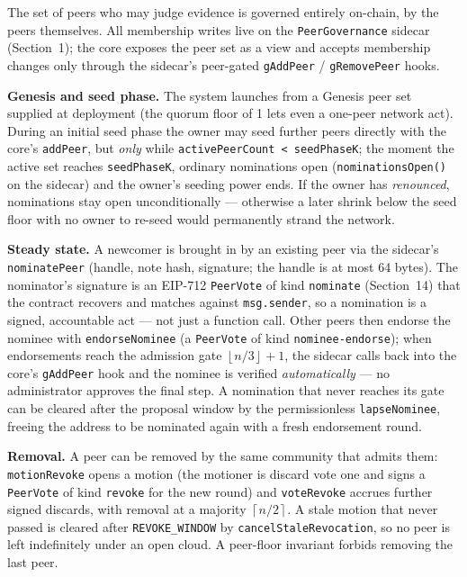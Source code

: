 \documentclass[11pt,a4paper]{article}
\newcommand{\ceilop}[1]{\ensuremath{\left\lceil #1 \right\rceil}}
\newcommand{\floorop}[1]{\ensuremath{\left\lfloor #1 \right\rfloor}}
\begin{document}
The set of peers who may judge evidence is governed entirely on-chain,
by the peers themselves. All membership writes live on the
\texttt{PeerGovernance} sidecar (Section~1); the core exposes the peer
set as a view and accepts membership changes only through the sidecar's
peer-gated \texttt{gAddPeer} / \texttt{gRemovePeer} hooks.

\textbf{Genesis and seed phase.} The system launches from a Genesis peer
set supplied at deployment (the quorum floor of 1 lets even a one-peer
network act). During an initial seed phase the owner may seed further
peers directly with the core's \texttt{addPeer}, but \emph{only} while
\texttt{activePeerCount < seedPhaseK}; the moment the active set reaches
\texttt{seedPhaseK}, ordinary nominations open
(\texttt{nominationsOpen()} on the sidecar) and the owner's seeding
power ends. If the owner has \emph{renounced}, nominations stay open
unconditionally --- otherwise a later shrink below the seed floor with
no owner to re-seed would permanently strand the network.

\textbf{Steady state.} A newcomer is brought in by an existing peer
via the sidecar's \texttt{nominatePeer} (handle, note hash, signature;
the handle is at most 64 bytes). The nominator's signature is an
EIP-712 \texttt{PeerVote} of kind \texttt{nominate} (Section~14) that
the contract recovers and matches against \texttt{msg.sender}, so a
nomination is a signed, accountable act --- not just a function call.
Other peers then endorse the nominee with \texttt{endorseNominee} (a
\texttt{PeerVote} of kind \texttt{nominee-endorse}); when endorsements
reach the admission gate $\floorop{n/3}+1$, the sidecar calls back
into the core's \texttt{gAddPeer} hook and the nominee is verified
\emph{automatically} --- no administrator approves the final step. A
nomination that never reaches its gate can be cleared after the
proposal window by the permissionless \texttt{lapseNominee}, freeing
the address to be nominated again with a fresh endorsement round.

\textbf{Removal.} A peer can be removed by the same community that
admits them: \texttt{motionRevoke} opens a motion (the motioner is
discard vote one and signs a \texttt{PeerVote} of kind \texttt{revoke}
for the new round) and \texttt{voteRevoke} accrues further signed
discards, with removal at a majority $\ceilop{n/2}$. A stale motion
that never passed is cleared after \texttt{REVOKE\_WINDOW} by
\texttt{cancelStaleRevocation}, so no peer is left indefinitely under
an open cloud. A peer-floor invariant forbids removing the last peer.
\end{document}
